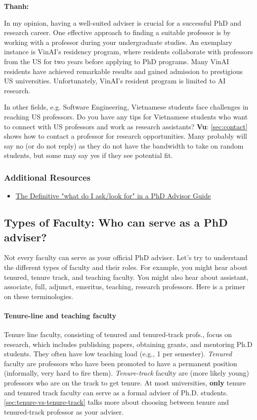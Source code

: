 \documentclass[oneside,11pt]{memoir}
\newenvironment{commentbox}[1][]{
  \small
  \begin{mybox}
    {\small \textbf{#1}}
  }{
  \end{mybox}
}
\begin{document}
\begin{commentbox}[Thanh:]
  In my opinion, having a well-suited adviser is crucial for a successful PhD and research career. One effective approach to finding a suitable professor is by working with a professor during your undergraduate studies. An exemplary instance is VinAI's residency program, where residents collaborate with professors from the US for two years before applying to PhD programs. Many VinAI residents have achieved remarkable results and gained admission to prestigious US universities. Unfortunately, VinAI's resident program is limited to AI research.

  In other fields, e.g. Software Engineering, Vietnamese students face challenges in reaching US professors. Do you have any tips for Vietnamese students who want to connect with US professors and work as research assistants?
  \tcblower
  \textbf{Vu}: \autoref{sec:contact} shows how to contact a professor for research opportunities. Many probably will say no (or do not reply) as they do not have the bandwidth to take on random students, but some may say yes if they see potential fit.
\end{commentbox}

\subsubsection*{Additional Resources}
\begin{itemize}
  \item \href{https://www.cs.columbia.edu/wp-content/uploads/2019/03/Get-Advisor.pdf}{The Definitive "what do I ask/look for" in a PhD Advisor Guide}
\end{itemize}
\subsection{Types of Faculty: Who can serve as a PhD adviser?}\label{sec:faculty-types}

Not every faculty can serve as your official PhD adviser. Let's try to understand the different types of faculty and their roles. For example, you might hear about tenured,  tenure track, and teaching faculty.  You might also hear about assistant, associate, full, adjunct, emeritus, teaching, research professors. Here is a primer on these terminologies.

\paragraph{Tenure-line and teaching faculty} Tenure line faculty, consisting of tenured and tenured-track profs., focus on research, which includes publishing papers, obtaining grants, and mentoring Ph.D students.  They often have low teaching load (e.g., 1 per semester). \emph{Tenured} faculty are professors who have been promoted to have a permanent position (informally, very hard to fire them).   \emph{Tenure-track} faculty are (more likely young) professors who are on the track to get tenure.  At most universities, \textbf{only} tenure and tenured track faculty can serve as a formal adviser of Ph.D. students. \autoref{sec:tenure-vs-tenure-track} talks more about choosing between tenure and tenured-track professor as your adviser.
\end{document}
